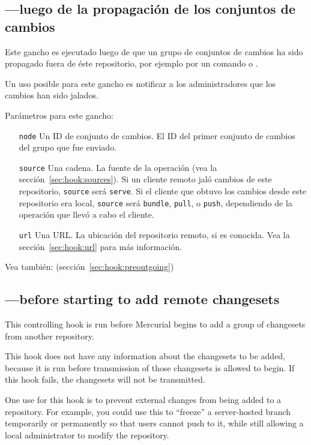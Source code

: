 \subsection{---luego de la propagación de los conjuntos
de cambios}
\label{sec:hook:outgoing}

Este gancho es ejecutado luego de que un grupo de conjuntos de cambios
ha sido propagado fuera de éste repositorio, por ejemplo por un
comando  o .

Un uso posible para este gancho es notificar a los administradores que
los cambios han sido jalados.

Parámetros para este gancho:
\begin{itemize}
\item[\texttt{node}] Un ID de conjunto de cambios. El ID del primer conjunto
  de cambios del grupo que fue enviado.
\item[\texttt{source}] Una cadena. La fuente de la operación (vea la
  sección~\ref{sec:hook:sources}).  Si un cliente remoto jaló cambios
  de este repositorio, \texttt{source} será \texttt{serve}.  Si el
  cliente que obtuvo los cambios desde este repositorio era local,
  \texttt{source} será \texttt{bundle}, \texttt{pull}, o
  \texttt{push}, dependiendo de la operación que llevó a cabo el
  cliente.
\item[\texttt{url}] Una URL. La ubicación del repositorio remoto, si
  es conocida. Vea la sección~\ref{sec:hook:url} para más información.
\end{itemize}

Vea también:  (sección~\ref{sec:hook:preoutgoing})

\subsection{---before starting to add remote changesets}
\label{sec:hook:prechangegroup}

This controlling hook is run before Mercurial begins to add a group of
changesets from another repository.

This hook does not have any information about the changesets to be
added, because it is run before transmission of those changesets is
allowed to begin.  If this hook fails, the changesets will not be
transmitted.

One use for this hook is to prevent external changes from being added
to a repository.  For example, you could use this to ``freeze'' a
server-hosted branch temporarily or permanently so that users cannot
push to it, while still allowing a local administrator to modify the
repository.


